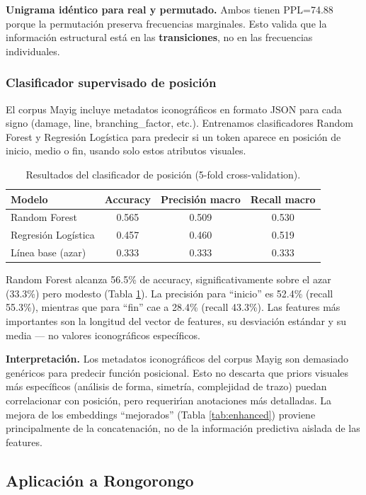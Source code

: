 \textbf{Unigrama id\'entico para real y permutado.} Ambos tienen PPL=74.88 porque la permutaci\'on preserva frecuencias marginales. Esto valida que la informaci\'on estructural est\'a en las \textbf{transiciones}, no en las frecuencias individuales.

\subsubsection{Clasificador supervisado de posici\'on}

El corpus Mayig incluye metadatos iconogr\'aficos en formato JSON para cada signo (damage, line, branching\_factor, etc.). Entrenamos clasificadores Random Forest y Regresi\'on Log\'istica para predecir si un token aparece en posici\'on de inicio, medio o fin, usando solo estos atributos visuales.

\begin{table}[h]
\centering
\caption{Resultados del clasificador de posici\'on (5-fold cross-validation).}
\label{tab:position_classifier}
\begin{tabular}{lccc}
\toprule
Modelo & Accuracy & Precisi\'on macro & Recall macro \\
\midrule
Random Forest & 0.565 & 0.509 & 0.530 \\
Regresi\'on Log\'istica & 0.457 & 0.460 & 0.519 \\
L\'inea base (azar) & 0.333 & 0.333 & 0.333 \\
\bottomrule
\end{tabular}
\end{table}

Random Forest alcanza 56.5\% de accuracy, significativamente sobre el azar (33.3\%) pero modesto (Tabla \ref{tab:position_classifier}). La precisi\'on para ``inicio'' es 52.4\% (recall 55.3\%), mientras que para ``fin'' cae a 28.4\% (recall 43.3\%). Las features m\'as importantes son la longitud del vector de features, su desviaci\'on est\'andar y su media --- no valores iconogr\'aficos espec\'ificos.

\textbf{Interpretaci\'on.} Los metadatos iconogr\'aficos del corpus Mayig son demasiado gen\'ericos para predecir funci\'on posicional. Esto no descarta que priors visuales m\'as espec\'ificos (an\'alisis de forma, simetr\'ia, complejidad de trazo) puedan correlacionar con posici\'on, pero requerir\'\i an anotaciones m\'as detalladas. La mejora de los embeddings ``mejorados'' (Tabla \ref{tab:enhanced}) proviene principalmente de la concatenaci\'on, no de la informaci\'on predictiva aislada de las features.

\subsection{Aplicaci\'on a Rongorongo}

